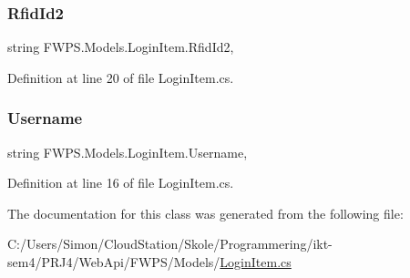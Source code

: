 \subsubsection{\texorpdfstring{Rfid\+Id2}{RfidId2}}
{\footnotesize\ttfamily string F\+W\+P\+S.\+Models.\+Login\+Item.\+Rfid\+Id2\hspace{0.3cm}{\ttfamily [get]}, {\ttfamily [set]}}



Definition at line 20 of file Login\+Item.\+cs.

\mbox{\label{class_f_w_p_s_1_1_models_1_1_login_item_a9088bb99487c0aee78c9551f766fa1be}} 
\subsubsection{\texorpdfstring{Username}{Username}}
{\footnotesize\ttfamily string F\+W\+P\+S.\+Models.\+Login\+Item.\+Username\hspace{0.3cm}{\ttfamily [get]}, {\ttfamily [set]}}



Definition at line 16 of file Login\+Item.\+cs.



The documentation for this class was generated from the following file\+:\begin{DoxyCompactItemize}
\item 
C\+:/\+Users/\+Simon/\+Cloud\+Station/\+Skole/\+Programmering/ikt-\/sem4/\+P\+R\+J4/\+Web\+Api/\+F\+W\+P\+S/\+Models/\mbox{\hyperlink{_login_item_8cs}{Login\+Item.\+cs}}\end{DoxyCompactItemize}
